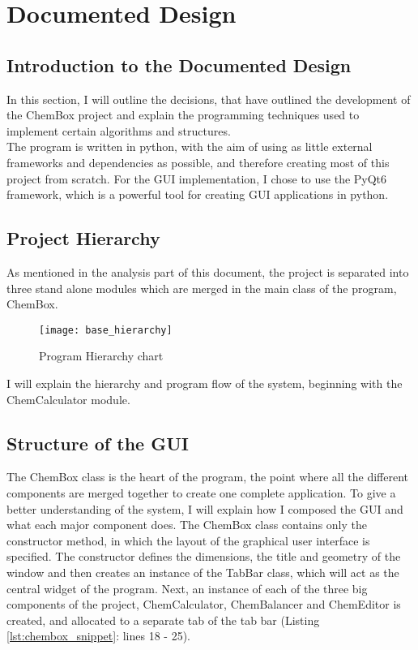 \documentclass[a4paper,12pt]{article}
\begin{document}
\newpage

\section{Documented Design}

\subsection{Introduction to the Documented Design}

In this section, I will outline the decisions, that have outlined the development of the ChemBox project and explain the programming techniques used to implement certain algorithms and structures.\\
The program is written in python, with the aim of using as little external frameworks and dependencies as possible, and therefore creating most of this project from scratch. For the GUI implementation, I chose to use the PyQt6 framework, which is a powerful tool for creating GUI applications in python.\\

\subsection{Project Hierarchy}

As mentioned in the analysis part of this document, the project is separated into three stand alone modules which are merged in the main class of the program, ChemBox.

\begin{figure} [h]
	\centering
	\texttt{[image: base\_hierarchy]}
	\caption{Program Hierarchy chart}
	\label{fig:tabs_mockup}
\end{figure}

I will explain the hierarchy and program flow of the system, beginning with the ChemCalculator module.
\newpage

\subsection{Structure of the GUI}

The ChemBox class is the heart of the program, the point where all the different components are merged together to create one complete application. To give a better understanding of the system, I will explain how I composed the GUI and what each major component does. The ChemBox class contains only the constructor method, in which the layout of the graphical user interface is specified. The constructor defines the dimensions, the title and geometry of the window and then creates an instance of the TabBar class, which will act as the central widget of the program. Next, an instance of each of the three big components of the project, ChemCalculator, ChemBalancer and ChemEditor is created, and allocated to a separate tab of the tab bar (Listing \ref{lst:chembox_snippet}: lines 18 - 25).
\end{document}
